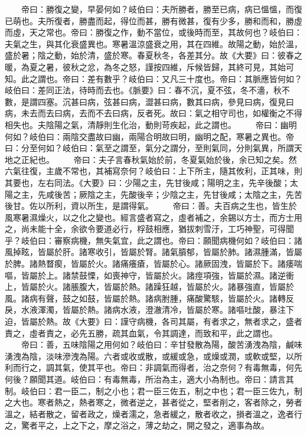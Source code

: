 　　帝曰：勝復之變，早晏何如？岐伯曰：夫所勝者，勝至已病，病已慍慍，而復已萌也。夫所復者，勝盡而起，得位而甚，勝有微甚，復有少多，勝和而和，勝虛而虛，天之常也。帝曰：勝復之作，動不當位，或後時而至，其故何也？岐伯曰：夫氣之生，與其化衰盛異也。寒暑溫涼盛衰之用，其在四維。故陽之動，始於溫，盛於暑；陰之動，始於清，盛於寒。春夏秋冬，各差其分。故《大要》曰：彼春之暖，為夏之暑，彼秋之忿，為冬之怒，謹按四維，斥候皆歸，其終可見，其始可知。此之謂也。帝曰：差有數乎？岐伯曰：又凡三十度也。帝曰：其脈應皆何如？岐伯曰：差同正法，待時而去也。《脈要》曰：春不沉，夏不弦，冬不濇，秋不數，是謂四塞。沉甚曰病，弦甚曰病，澀甚曰病，數其曰病，參見曰病，復見曰病，未去而去曰病，去而不去曰病，反者死。故曰：氣之相守司也，如權衡之不得相失也。夫陰陽之氣，清靜則生化治，動則苛疾起，此之謂也。
　　帝曰：幽明何如？岐伯曰：兩陰交盡故曰幽，兩陽合明故曰明，幽明之配，寒暑之異也。帝曰：分至何如？岐伯曰：氣至之謂至，氣分之謂分，至則氣同，分則氣異，所謂天地之正紀也。
　　帝曰：夫子言春秋氣始於前，冬夏氣始於後，余已知之矣。然六氣往復，主歲不常也，其補寫奈何？岐伯曰：上下所主，隨其攸利，正其味，則其要也，左右同法。《大要》曰：少陽之主，先甘後咸；陽明之主，先辛後酸；太陽之主，先咸後苦；厥陰之主，先酸後辛；少陰之主，先甘後咸；太陰之主，先苦後甘。佐以所利，資以所生，是謂得氣。
　　帝曰：善。夫百病之生也，皆生於風寒暑濕燥火，以之化之變也。經言盛者寫之，虛者補之，余錫以方士，而方士用之，尚未能十全，余欲令要道必行，桴鼓相應，猶拔刺雪汙，工巧神聖，可得聞乎？岐伯曰：審察病機，無失氣宜，此之謂也。帝曰：願聞病機何如？岐伯曰：諸風掉眩，皆屬於肝。諸寒收引，皆屬於腎。諸氣膹郁，皆屬於肺。諸濕腫滿，皆屬於脾。諸熱瞀瘈，皆屬於火。諸痛癢瘡，皆屬於心。諸厥固洩，皆屬於下。諸痿喘嘔，皆屬於上。諸禁鼓慄，如喪神守，皆屬於火。諸痙項強，皆屬於濕。諸逆衝上，皆屬於火。諸脹腹大，皆屬於熱。諸躁狂越，皆屬於火。諸暴強直，皆屬於風。諸病有聲，鼓之如鼓，皆屬於熱。諸病胕腫，痛酸驚駭，皆屬於火。諸轉反戾，水液渾濁，皆屬於熱。諸病水液，澄澈清冷，皆屬於寒。諸嘔吐酸，暴注下迫，皆屬於熱。故《大要》曰：謹守病機，各司其屬，有者求之，無者求之，盛者責之，虛者責之，必先五勝，疏其血氣，令其調達，而致和平，此之謂也。
　　帝曰：善，五味陰陽之用何如？岐伯曰：辛甘發散為陽，酸苦湧洩為陰，鹹味湧洩為陰，淡味滲洩為陽。六者或收或散，或緩或急，或燥或潤，或軟或堅，以所利而行之，調其氣，使其平也。帝曰：非調氣而得者，治之奈何？有毒無毒，何先何後？願聞其道。岐伯曰：有毒無毒，所治為主，適大小為制也。帝曰：請言其制。岐伯曰：君一臣二，制之小也；君一臣三佐五，制之中也；君一臣三佐九，制之大也。寒者熱之，熱者寒之，微者逆之，甚者從之，堅者削之，客者除之，勞者溫之，結者散之，留者政之，燥者濡之，急者緩之，散者收之，損者溫之，逸者行之，驚者平之，上之下之，摩之浴之，薄之劫之，開之發之，適事為故。

